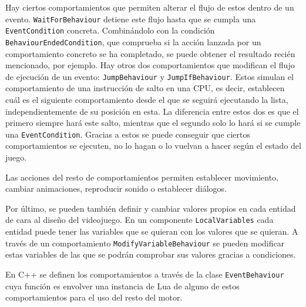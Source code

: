 \medskip

Hay ciertos comportamientos que permiten alterar el flujo de estos dentro de un evento. \texttt{WaitForBehaviour} detiene este flujo hasta que se cumpla una \texttt{EventCondition} concreta. Combinándolo con la condición \texttt{BehaviourEndedCondition}, que comprueba si la acción lanzada por un comportamiento concreto se ha completado, se puede obtener el resultado recién mencionado, por ejemplo. Hay otros dos comportamientos que modifican el flujo de ejecución de un evento: \texttt{JumpBehaviour} y \texttt{JumpIfBehaviour}. Estos simulan el comportamiento de una instrucción de salto en una CPU, es decir, establecen cuál es el siguiente comportamiento desde el que se seguirá ejecutando la lista, independientemente de su posición en esta. La diferencia entre estos dos es que el primero siempre hará este salto, mientras que el segundo solo lo hará si se cumple una \texttt{EventCondition}. Gracias a estos se puede conseguir que ciertos comportamientos se ejecuten, no lo hagan o lo vuelvan a hacer según el estado del juego.

\smallskip

Las acciones del resto de comportamientos permiten establecer movimiento, cambiar animaciones, reproducir sonido o establecer diálogos. 

\medskip

Por último, se pueden también definir y cambiar valores propios en cada entidad de cara al diseño del videojuego. En un componente \texttt{LocalVariables} cada entidad puede tener las variables que se quieran con los valores que se quieran. A través de un comportamiento \texttt{ModifyVariableBehaviour} se pueden modificar estas variables de las que se podrán comprobar sus valores gracias a condiciones. 

\medskip

En C++ se definen los comportamientos a través de la clase \texttt{EventBehaviour} cuya función es envolver una instancia de Lua de alguno de estos comportamientos para el uso del resto del motor. 